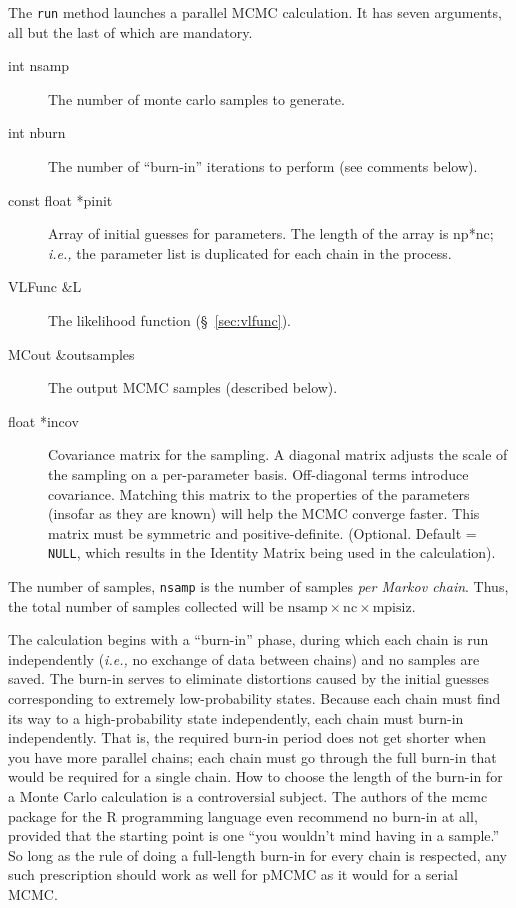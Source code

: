 \documentclass[11pt]{article}
\begin{document}
The \texttt{run} method launches a parallel MCMC calculation.  It has
seven arguments, all but the last of which are mandatory.
\begin{description}
\item[int nsamp] The number of monte carlo samples to generate.
\item[int nburn] The number of ``burn-in'' iterations to perform (see
  comments below).
\item[const float *pinit] Array of initial guesses for parameters.
  The length of the array is np*nc; \emph{i.e.,} the parameter list is
  duplicated for each chain in the process.
\item[VLFunc \&L] The likelihood function (\S~\ref{sec:vlfunc}).
\item[MCout \&outsamples] The output MCMC samples (described below).
\item[float *incov] Covariance matrix for the sampling.  A diagonal
  matrix adjusts the scale of the sampling on a per-parameter basis.
  Off-diagonal terms introduce covariance.  Matching this matrix to
  the properties of the parameters (insofar as they are known) will
  help the MCMC converge faster.  This matrix must be symmetric and
  positive-definite. (Optional.  Default = \texttt{NULL}, which
  results in the Identity Matrix being used in the calculation).
\end{description}

The number of samples, \texttt{nsamp} is the number of samples
\emph{per Markov chain}. Thus, the total number of samples collected
will be $\text{nsamp} \times \text{nc} \times \text{mpisiz}$.

The calculation begins with a ``burn-in'' phase, during which each
chain is run independently (\emph{i.e.,} no exchange of data between
chains) and no samples are saved.  The burn-in serves to eliminate
distortions caused by the initial guesses corresponding to extremely
low-probability states.  Because each chain must find its way to a
high-probability state independently, each chain must burn-in
independently.  That is, the required burn-in period does not get
shorter when you have more parallel chains; each chain must go through
the full burn-in that would be required for a single chain.  How to
choose the length of the burn-in for a Monte Carlo calculation is a
controversial subject.  The authors of the mcmc package for the R
programming language even recommend no burn-in at all, provided that
the starting point is one ``you wouldn't mind having in a sample.''
So long as the rule of doing a full-length burn-in for every chain is
respected, any such prescription should work as well for pMCMC as it
would for a serial MCMC.
\end{document}
